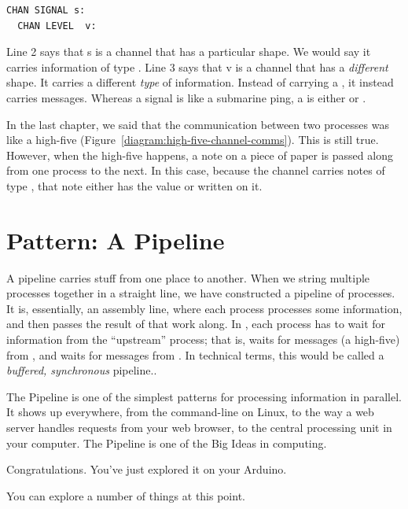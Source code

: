 \begin{lstlisting}[firstnumber=2]
  CHAN SIGNAL s:
  CHAN LEVEL  v:
\end{lstlisting}
	
	Line 2 says that {\code s} is a channel that has a particular shape. We would say it carries information of type \SIGNALT. Line 3 says that {\code v} is a channel that has a {\em different} shape. It carries a different {\em type} of information. Instead of carrying a \SIGNALV, it instead carries \LEVELT messages. Whereas a signal is like a submarine ping, a \LEVELT is either \HIGH or \LOW.
	
In the last chapter, we said that the communication between two processes was like a high-five (Figure~\vref{diagram:high-five-channel-comms}). {\strong This is still true.} However, when the high-five happens, a note on a piece of paper is passed along from one process to the next. In this case, because the channel carries notes of type \LEVELT, that note either has the value \HIGH or \LOW written on it.

\section{Pattern: A Pipeline}
A pipeline carries stuff from one place to another. When we string multiple processes together in a straight line, we have constructed a {\strong pipeline} of processes. It is, essentially, an assembly line, where each process processes some information, and then passes the result of that work along. In \plumbing, each process has to wait for information from the ``upstream'' process; that is, \digo waits for messages (a high-five) from \toggle, and \toggle waits for messages from \bp. In technical terms, this would be called a {\em buffered, synchronous} pipeline.. 

The Pipeline is one of the simplest patterns for processing information in parallel. It shows up everywhere, from the command-line on Linux, to the way a web server handles requests from your web browser, to the central processing unit in your computer. The Pipeline is one of the Big Ideas in computing.

Congratulations. You've just explored it on your Arduino.

\EXPLORATIONS
You can explore a number of things at this point. 

